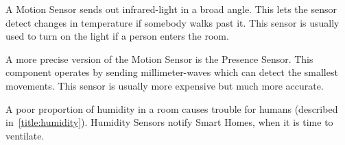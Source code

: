 A Motion Sensor sends out infrared-light in a broad angle. This lets the sensor detect changes in temperature if somebody walks past it. This sensor is usually used to turn on the light if a person enters the room.

A more precise version of the Motion Sensor is the Presence Sensor. This component operates by sending millimeter-waves which can detect the smallest movements. This sensor is usually more expensive but much more accurate.

A poor proportion of humidity in a room causes trouble for humans (described in~\ref{title:humidity}). Humidity Sensors notify Smart Homes, when it is time to ventilate.

\noindent\cite{LRWeb:46}